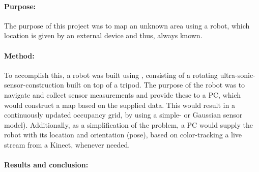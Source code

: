 \paragraph{Purpose:}The purpose of this project was to map an unknown area using a robot, which location is given by an external device and thus, always known.

\paragraph{Method:}To accomplish this, a robot was built using \legoms, consisting of a rotating ultra-sonic-sensor-construction built on top of a tripod.
The purpose of the robot was to navigate and collect sensor measurements and provide these to a PC, which would construct a map based on the supplied data.
This would result in a continuously updated occupancy grid, by using a simple- or Gaussian sensor model).
Additionally, as a simplification of the problem, a PC would supply the robot with its location and orientation (pose), based on color-tracking a live stream from a Kinect, whenever needed.

\paragraph{Results and conclusion:}
